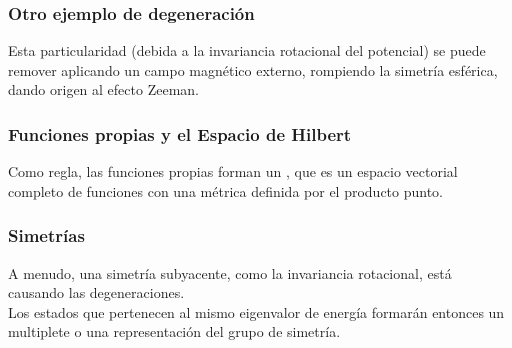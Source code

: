 \documentclass[12pt]{beamer}
\begin{document}
\begin{frame}
\frametitle{Otro ejemplo de degeneración}
Esta particularidad (debida a la invariancia rotacional del potencial) se puede remover aplicando un campo magnético externo, rompiendo la simetría esférica, dando origen al efecto Zeeman.
\end{frame}
\begin{frame}
\frametitle{Funciones propias y el Espacio de Hilbert}
Como regla, las funciones propias forman un , que es un espacio vectorial completo de funciones con una métrica definida por el producto punto.
\end{frame}
\begin{frame}
\frametitle{Simetrías}
A menudo, una simetría subyacente, como la invariancia rotacional, está causando las degeneraciones.
\\
\bigskip
\pause
Los estados que pertenecen al mismo eigenvalor de energía formarán entonces un multiplete o una representación del grupo de simetría.
\end{frame}
\end{document}
